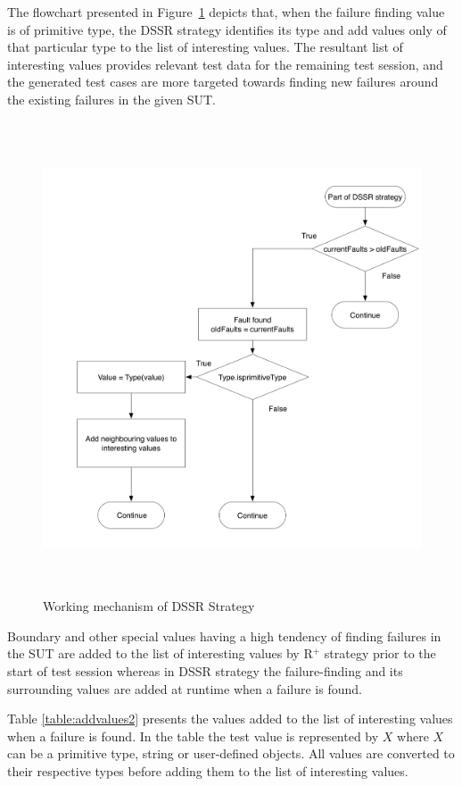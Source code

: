 The flowchart presented in Figure~\ref{fig:Working_DSSS} depicts that, when the failure finding value is of primitive type, the DSSR strategy identifies its type and add values only of that particular type to the list of interesting values. The resultant list of interesting values provides relevant test data for the remaining test session, and the generated test cases are more targeted towards finding new failures around the existing failures in the given SUT.
\bigskip
\bigskip
\begin{figure}[H]
\centering
\includegraphics[width=12cm, height=14cm]{chapter4/flowchart1.png}
\bigskip
\caption{Working mechanism of DSSR Strategy}
\label{fig:Working_DSSS}
\end{figure}
\bigskip
\bigskip
Boundary and other special values having a high tendency of finding failures in the SUT are added to the list of interesting values by R$^+$ strategy prior to the start of test session whereas in DSSR strategy the failure-finding and its surrounding values are added at runtime when a failure is found. 

Table \ref{table:addvalues2} presents the values added to the list of interesting values when a failure is found. In the table the test value is represented by $X$ where $X$ can be a primitive type, string or user-defined objects. All values are converted to their respective types before adding them to the list of interesting values.



